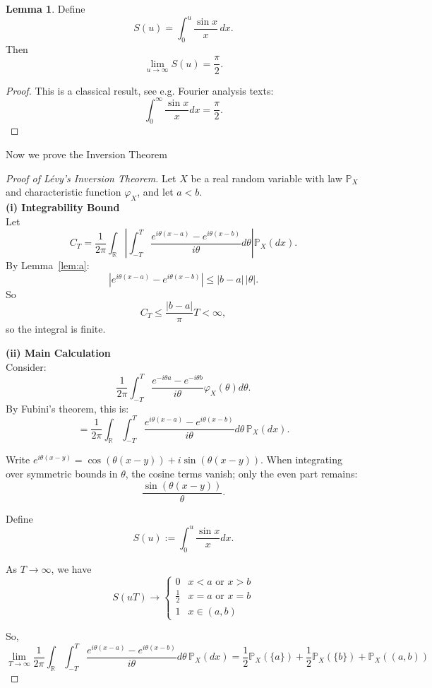 \documentclass[11pt,a4paper]{article}
\theoremstyle{definition}
\newtheorem{lemma}{Lemma}[section]
\begin{document}
\begin{lemma}
Define
\[
S(u) = \int_{0}^{u} \frac{\sin x}{x}\, dx.
\]
Then
\[
\lim_{u \to \infty} S(u) = \frac{\pi}{2}.
\]
\end{lemma}
\begin{proof}
This is a classical result, see e.g. Fourier analysis texts:
\[
\int_{0}^{\infty} \frac{\sin x}{x} dx = \frac{\pi}{2}.
\]
\end{proof}
\noindent Now we prove the Inversion Theorem
\begin{proof}[Proof of Lévy's Inversion Theorem]

Let $X$ be a real random variable with law $\mathbb{P}_X$ and characteristic function $\varphi_X$, and let $a < b$.
~\\\textbf{(i) Integrability Bound}
\\Let
\[
C_T = \frac{1}{2\pi} \int_{\mathbb{R}} \left| \int_{-T}^T \frac{e^{i\theta(x-a)} - e^{i\theta(x-b)}}{i\theta} d\theta \right| \mathbb{P}_X(dx).
\]
By Lemma~\ref{lem:a}:
\[
|e^{i\theta(x-a)} - e^{i\theta(x-b)}| \leq |b-a|\,|\theta|.
\]
So
\[
C_T \leq \frac{|b-a|}{\pi} T < \infty,
\]
so the integral is finite.

\vspace{1em}
\noindent \textbf{(ii) Main Calculation}
\\ \noindent Consider:
\[
\frac{1}{2\pi} \int_{-T}^{T} \frac{e^{-i\theta a} - e^{-i\theta b}}{i\theta} \varphi_X(\theta) d\theta.
\]
By Fubini's theorem, this is:
\[
= \frac{1}{2\pi} \int_{\mathbb{R}} \int_{-T}^T \frac{e^{i\theta(x-a)} - e^{i\theta(x-b)}}{i\theta} d\theta\, \mathbb{P}_X(dx).
\]

Write $e^{i\theta(x-y)} = \cos(\theta(x-y)) + i\sin(\theta(x-y))$. 
When integrating over symmetric bounds in $\theta$, the cosine terms vanish; only the even part remains:
\[
\frac{\sin(\theta(x-y))}{\theta}.
\]

Define
\[
S(u) := \int_0^u \frac{\sin x}{x} dx.
\]

As $T \to \infty$, we have
\[
S(uT) \to 
\begin{cases}
0      & x < a \text{ or } x > b\\
\frac{1}{2}    & x=a \text{ or } x=b\\
1      & x \in (a,b)
\end{cases}
\]

So,
\[
\lim_{T\to\infty}\frac{1}{2\pi} \int_{\mathbb{R}} \int_{-T}^T \frac{e^{i\theta(x-a)} - e^{i\theta(x-b)}}{i\theta} d\theta\, \mathbb{P}_X(dx)
= \frac{1}{2} \mathbb{P}_X(\{a\}) + \frac{1}{2} \mathbb{P}_X(\{b\}) + \mathbb{P}_X((a,b))
\]


\end{proof}
\end{document}
